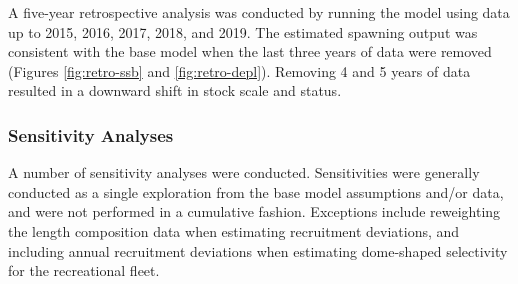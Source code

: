 \documentclass[11pt,
  english,
  letterpaper,
]{article}
\begin{document}
\leavevmode\tagmcend\tagstructend


A five-year retrospective analysis was conducted by running the model using data up to 2015, 2016, 2017, 2018, and 2019. The estimated spawning output was consistent with the base model when the last three years of data were removed (Figures \ref{fig:retro-ssb} and \ref{fig:retro-depl}). Removing 4 and 5 years of data resulted in a downward shift in stock scale and status.

\leavevmode\tagmcend\tagstructend\par


\hypertarget{sensitivity-analyses}{%
\subsubsection{Sensitivity Analyses}\label{sensitivity-analyses}}

\leavevmode\tagmcend\tagstructend


A number of sensitivity analyses were conducted. Sensitivities were generally conducted as a single exploration from the base model assumptions and/or data, and were not performed in a cumulative fashion. Exceptions include reweighting the length composition data when estimating recruitment deviations, and including annual recruitment deviations when estimating dome-shaped selectivity for the recreational fleet.

\leavevmode\tagmcend\tagstructend\par
\end{document}
